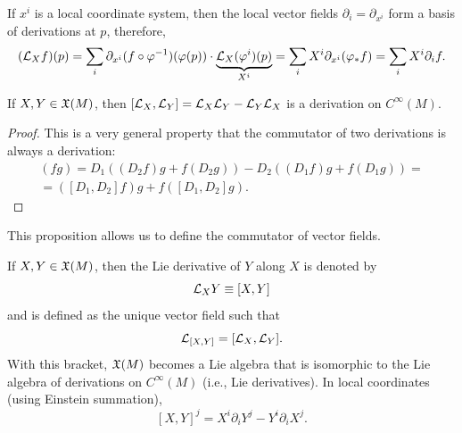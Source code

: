\begin{cor}
    If $x^i$ is a local coordinate system, then the local vector fields $\partial_i=\partial_{x^i}$ form a basis of derivations at $p$, therefore, 
    \[(\mathcal{L}_X f)(p)=\sum_i \partial_{x^i}(f\circ\varphi^{-1})(\varphi(p))\cdot \underbrace{\mathcal{L}_X (\varphi^i)(p)}_{X^i}=\sum_i X^i \partial_{x^i}(\varphi_\ast f)=\sum_i X^i \partial_{i} f.\]
\end{cor}

\begin{prop}
    If $X,Y\in\mathfrak{X}(M)$, then $[\mathcal{L}_X,\mathcal{L}_Y]=\mathcal{L}_X\mathcal{L}_Y-\mathcal{L}_Y\mathcal{L}_X$ is a derivation on $C^\infty(M)$.
\end{prop}
\begin{proof}
    This is a very general property that the commutator of two derivations is always a derivation:
    \begin{multline}
        [D_1,D_2](fg)=D_1((D_2f)g+f(D_2g))-D_2((D_1f)g+f(D_1g))=\\=([D_1,D_2]f)g+f([D_1,D_2]g).
    \end{multline}
\end{proof}

This proposition allows us to define the commutator of vector fields.

\begin{defn}
    If $X,Y\in\mathfrak{X}(M)$, then the Lie derivative of $Y$ along $X$ is denoted by 
    \[\mathcal{L}_X Y\equiv [X,Y]\] and is defined as the unique vector field such that
    \[\mathcal{L}_{[X,Y]}=[\mathcal{L}_X,\mathcal{L}_Y].\]
    With this bracket, $\mathfrak{X}(M)$ becomes a Lie algebra that is isomorphic to the Lie algebra of derivations on $C^\infty(M)$ (i.e., Lie derivatives).
    In local coordinates (using Einstein summation),
    \[[X,Y]^j=X^i \partial_i Y^j-Y^i \partial_i X^j.\label{eq Lie derivative in components}\]
\end{defn}

